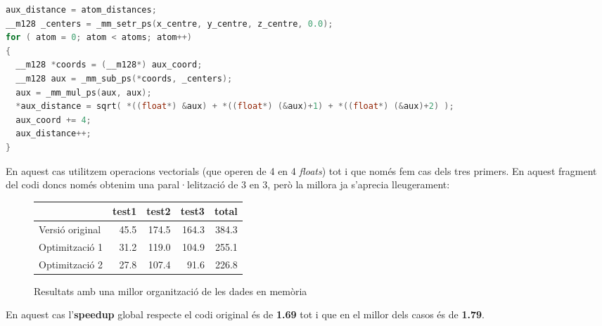 \begin{lstlisting}[label=vect1, caption=Primer dels dos bucles interns aplicant vectorització, language=C]
aux_distance = atom_distances;
__m128 _centers = _mm_setr_ps(x_centre, y_centre, z_centre, 0.0);
for ( atom = 0; atom < atoms; atom++)
{
  __m128 *coords = (__m128*) aux_coord;
  __m128 aux = _mm_sub_ps(*coords, _centers);
  aux = _mm_mul_ps(aux, aux);
  *aux_distance = sqrt( *((float*) &aux) + *((float*) (&aux)+1) + *((float*) (&aux)+2) );
  aux_coord += 4;
  aux_distance++;
}
\end{lstlisting}

En aquest cas utilitzem operacions vectorials (que operen de 4 en 4 \emph{floats}) tot i que només fem cas dels tres primers. En aquest fragment del codi doncs només obtenim una paral·lelització de 3 en 3, però la millora ja s'aprecia lleugerament:

\begin{figure}[ht]
  \caption{Resultats amb una millor organització de les dades en memòria}\label{fig:elapsed_2}
  \begin{center}
    \begin{tabular}{ l r r r r }
      & test1 & test2 & test3 & total \\
      \hline
      Versió original & 45.5 & 174.5 & 164.3 & 384.3 \\
      Optimització 1 & 31.2 & 119.0 & 104.9 & 255.1 \\
      Optimització 2 & 27.8 & 107.4 & 91.6 & 226.8 \\
    \end{tabular}
  \end{center}
\end{figure}

En aquest cas l'\textbf{speedup} global respecte el codi original és de \textbf{1.69} tot i que en el millor dels casos és de \textbf{1.79}.

